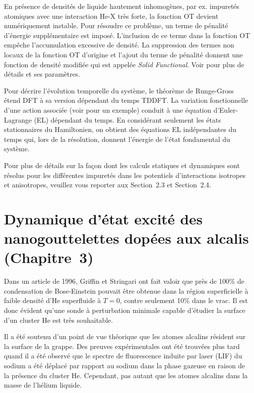 		En présence de densités de liquide hautement inhomogènes, par ex. impuretés atomiques avec une interaction He-X très forte, la fonction OT devient numériquement instable. Pour résoudre ce problème, un terme de pénalité d'énergie supplémentaire est imposé. L'inclusion de ce terme dans la fonction OT empêche l'accumulation excessive de densité. La suppression des termes non locaux de la fonction OT d'origine et l'ajout du terme de pénalité donnent une fonction de densité modifiée qui est appelée \emph{Solid Functional}. Voir  pour plus de détails et ses paramètres.
		
		Pour décrire l'évolution temporelle du système, le théorème de Runge-Gross étend DFT à sa version dépendant du temps TDDFT\citep{Run84}. La variation fonctionnelle d'une action associée (voir  pour un exemple) conduit à une équation d'Euler-Lagrange (EL) dépendant du temps. En considérant seulement les états stationnaires du Hamiltonien, on obtient des équations EL indépendantes du temps qui, lors de la résolution, donnent l'énergie de l'état fondamental du système.
		
		Pour plus de détails sur la façon dont les calculs statiques et dynamiques sont résolus pour les différentes impuretés dans les potentiels d'interactions isotropes et anisotropes, veuillez vous reporter aux Section~2.3 et Section~2.4.
		
	\section*{Dynamique d'état excité des nanogouttelettes dopées aux alcalis\\\small(Chapitre~3)}
		Dans un article de 1996\citep{Griffin1996}, Griffin et Stringari ont fait valoir que près de 100\% de condensation de Bose-Einstein pouvait être obtenue dans la région superficielle à faible densité d'He superfluide à $T=0$, contre seulement 10\% dans le vrac. Il est donc évident qu'une sonde à perturbation minimale capable d'étudier la surface d'un cluster He est très souhaitable.
		
		Il a été soutenu d'un point de vue théorique\citep{Dalfovo1994} que les atomes alcalins résident sur la surface de la grappe. Des preuves expérimentales ont été trouvées\citep{Stienkemeier1995-1,Stienkemeier1995-2,Ancilotto1995-1} plus tard quand il a été observé que le spectre de fluorescence induite par laser (LIF) du sodium a été déplacé par rapport au sodium dans la phase gazeuse en raison de la présence du cluster He. Cependant, pas autant que les atomes alcalins dans la masse de l'hélium liquide.
		
